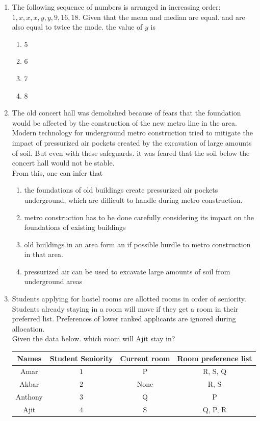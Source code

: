\documentclass[journal]{IEEEtran}
\begin{document}
\begin{enumerate}[start=53]
    \item The following sequence of numbers is arranged in increasing order: $1, x, x, x, y, y, 9, 16, 18$. Given that the mean and median are equal. and are also equal to twice the mode. the value of $y$ is
    \begin{multicols}{4}
        \begin{enumerate}
            \item $5$
            \item $6$
            \item $7$
            \item $8$
        \end{enumerate}
    \end{multicols}

    \item The old concert hall was demolished because of fears that the foundation would be affected by the construction of the new metro line in the area. Modern technology for underground metro construction tried to mitigate the impact of pressurized air pockets created by the excavation of large amounts of soil. But even with these safeguards. it was feared that the soil below the concert hall would not be stable.\\
    From this, one can infer that
    \begin{enumerate}
        \item the foundations of old buildings create pressurized air pockets underground, which are difficult to handle during metro construction.
        \item metro construction has to be done carefully considering its impact on the foundations of existing buildings
        \item old buildings in an area form an if possible hurdle to metro construction in that area.
        \item pressurized air can be used to excavate large amounts of soil from underground areas
    \end{enumerate}

    \item Students applying for hostel rooms are allotted rooms in order of seniority. Students already staying in a room will move if they get a room in their preferred list. Preferences of lower ranked applicants are ignored during allocation.\\
    Given the data below. which room will Ajit stay in?
    \begin{table}[h!]
    \centering
    \begin{tabular}{|c|c|c|c|}
        \hline
        Names & Student Seniority & Current room & Room preference list \\ \hline
        Amar & $1$ & P & R, S, Q  \\ \hline
        Akbar & $2$ & None & R, S\\ \hline
        Anthony & $3$ & Q & P \\ \hline
        Ajit & $4$ & S & Q, P, R\\ \hline
    \end{tabular}
    \end{table}


\end{enumerate}
\end{document}
